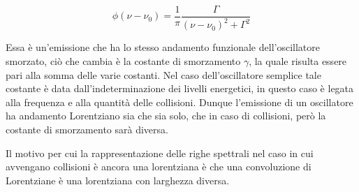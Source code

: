 \begin{equation*}
  \phi(\nu - \nu_0)=\frac{1}{\pi} \frac{\Gamma}{(\nu - \nu_0)^2 + \Gamma^2}
\end{equation*}

Essa è un'emissione che ha lo stesso andamento funzionale dell'oscillatore smorzato, ciò che cambia è la costante di smorzamento $\gamma$, la quale risulta essere pari alla somma delle varie costanti. Nel caso dell'oscillatore semplice tale costante è data dall'indeterminazione dei livelli energetici, in questo caso è legata alla frequenza e alla quantità delle collisioni. Dunque l'emissione di un oscillatore ha andamento Lorentziano sia che sia solo, che in caso di collisioni, però la costante di smorzamento sarà diversa.

Il motivo per cui la rappresentazione delle righe spettrali nel caso in cui avvengano collisioni è ancora una lorentziana è che una convoluzione di Lorentziane è una lorentziana con larghezza diversa.

